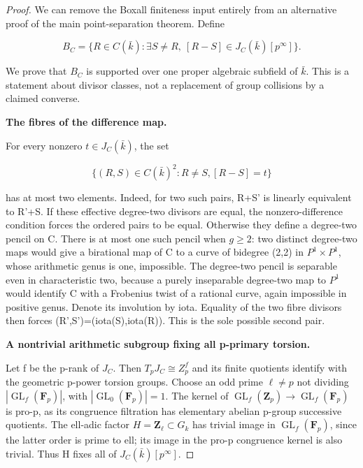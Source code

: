 \begin{proof}

We can remove the Boxall finiteness input entirely from an alternative proof of the main point-separation theorem. Define

\[B_C=\{R\in C(\bar k):\exists S\ne R,\ [R-S]\in J_C(\bar k)[p^\infty]\}.\]

We prove that \(B_C\) is supported over one proper algebraic subfield of \(\bar k\). This is a statement about divisor classes, not a replacement of group collisions by a claimed converse.

\textbf{The fibres of the difference map.}

For every nonzero \(t{\in}J_C(\bar k)\), the set

\[\{(R,S)\in C(\bar k)^2:R\ne S,[R-S]=t\}\]

has at most two elements. Indeed, for two such pairs, R+S' is linearly equivalent to R'+S. If these effective degree-two divisors are equal, the nonzero-difference condition forces the ordered pairs to be equal. Otherwise they define a degree-two pencil on C. There is at most one such pencil when \(g{\ge}2\): two distinct degree-two maps would give a birational map of C to a curve of bidegree (2,2) in \(P^1{\times}P^1\), whose arithmetic genus is one, impossible. The degree-two pencil is separable even in characteristic two, because a purely inseparable degree-two map to \(P^1\) would identify C with a Frobenius twist of a rational curve, again impossible in positive genus. Denote its involution by iota. Equality of the two fibre divisors then forces (R',S')=(iota(S),iota(R)). This is the sole possible second pair.

\textbf{A nontrivial arithmetic subgroup fixing all p-primary torsion.}

Let f be the p-rank of \(J_C\). Then \(T_pJ_C\cong Z_p^f\) and its finite quotients identify with the geometric p-power torsion groups. Choose an odd prime \(\ell{\ne}p\) not dividing \(|\operatorname{GL}_f(\mathbf{F}_p)|\), with \(|\operatorname{GL}_0(\mathbf{F}_p)|=1\). The kernel of \(\operatorname{GL}_f(\mathbf{Z}_p){\to}\operatorname{GL}_f(\mathbf{F}_p)\) is pro-p, as its congruence filtration has elementary abelian p-group successive quotients. The ell-adic factor \(H=\mathbf{Z}_\ell{\subset}G_k\) has trivial image in \(\operatorname{GL}_f(\mathbf{F}_p)\), since the latter order is prime to ell; its image in the pro-p congruence kernel is also trivial. Thus H fixes all of \(J_C(\bar k)[p^{\infty}]\).


\end{proof}
